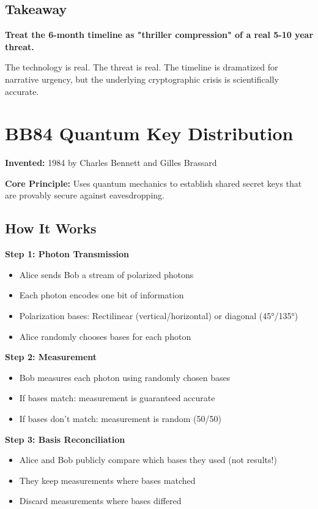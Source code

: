 \documentclass[12pt,oneside]{book}
\begin{document}
\subsection{Takeaway}

\textcolor{neongreen}{\textbf{Treat the 6-month timeline as "thriller compression" of a real 5-10 year threat.}}

The technology is real. The threat is real. The timeline is dramatized for narrative urgency, but the underlying cryptographic crisis is scientifically accurate.

\section{BB84 Quantum Key Distribution}

\textbf{Invented:} 1984 by Charles Bennett and Gilles Brassard

\textbf{Core Principle:} Uses quantum mechanics to establish shared secret keys that are provably secure against eavesdropping.

\subsection{How It Works}

\textbf{Step 1: Photon Transmission}
\begin{itemize}
\item Alice sends Bob a stream of polarized photons
\item Each photon encodes one bit of information
\item Polarization bases: Rectilinear (vertical/horizontal) or diagonal (45°/135°)
\item Alice randomly chooses bases for each photon
\end{itemize}

\textbf{Step 2: Measurement}
\begin{itemize}
\item Bob measures each photon using randomly chosen bases
\item If bases match: measurement is guaranteed accurate
\item If bases don't match: measurement is random (50/50)
\end{itemize}

\textbf{Step 3: Basis Reconciliation}
\begin{itemize}
\item Alice and Bob publicly compare which bases they used (not results!)
\item They keep measurements where bases matched
\item Discard measurements where bases differed
\end{itemize}
\end{document}
